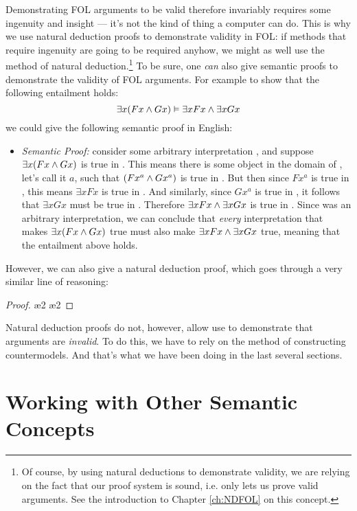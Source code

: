 Demonstrating FOL arguments to be valid therefore invariably requires some ingenuity and insight --- it's not the kind of thing a computer can do. This is why we use natural deduction proofs to demonstrate validity in FOL: if methods that require ingenuity are going to be required anyhow, we might as well use the method of natural deduction.\footnote{Of course, by using natural deductions to demonstrate validity, we are relying on the fact that our proof system is sound, i.e. only lets us prove valid arguments.  See the introduction to Chapter \ref{ch:NDFOL} on this concept.}
To be sure, one \emph{can} also give semantic proofs to demonstrate the validity of FOL arguments.  For example to show that the following entailment holds:
$$\exists x(Fx \wedge Gx) \vDash \exists x Fx \wedge \exists xGx$$
we could give the following semantic proof in English:
\begin{itemize}
\item[] \emph{Semantic Proof:} consider some arbitrary interpretation , and suppose $\exists x(Fx \wedge Gx)$ is true in .  This means there is some object in the domain of , let's call it $a$, such that $(Fx^a \wedge Gx^a)$ is true in .  But then since $Fx^a$ is true in , this means $\exists xFx$ is true in .  And similarly, since $Gx^a$ is true in , it follows that $\exists xGx$ must be true in .  Therefore $\exists x Fx \wedge \exists xGx$ is true in .  Since  was an arbitrary interpretation, we can conclude that \emph{every} interpretation that makes $\exists x(Fx \wedge Gx)$ true must also make $\exists x Fx \wedge \exists xGx$ true, meaning that the entailment above holds.
\end{itemize}
However, we can also give a natural deduction proof, which goes through a very similar line of reasoning:
\begin{proof}
	 
	\open
		 
		\ae{2}
		 
		\ae{2}
		 
		 
	\close
	 
\end{proof}
Natural deduction proofs do not, however, allow use to demonstrate that arguments are \emph{invalid}.  To do this, we have to rely on the method of constructing countermodels.  And that's what we have been doing in the last several sections.


\section{Working with Other Semantic Concepts}


